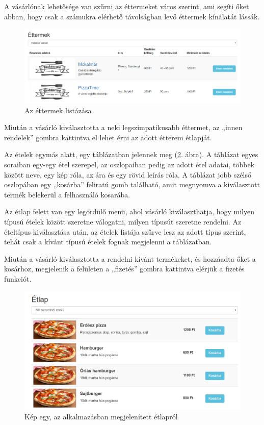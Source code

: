 A vásárlónak lehetősége van szűrni az éttermeket város szerint, ami segíti őket abban, hogy csak a számukra elérhető távolságban levő éttermek kínálatát lássák.

\begin{figure}
\centering
\includegraphics[scale=0.48]{kepek/restaurants.png}
\caption{Az éttermek listázása}
\label{fig:restaurants}
\end{figure}


Miután a vásárló kiválasztotta a neki legszimpatikusabb éttermet, az „innen rendelek” gombra kattintva el lehet érni az adott étterem étlapját.

Az ételek egymás alatt, egy táblázatban jelennek meg (\ref{fig:menu}. ábra). A táblázat egyes soraiban egy-egy étel szerepel, az oszlopaiban pedig az adott étel adatai, többek között neve, egy kép róla, az ára és egy rövid leírás róla. A táblázat jobb szélső oszlopában egy „kosárba” feliratú gomb található, amit megnyomva a kiválasztott termék belekerül a felhasználó kosarába.

Az étlap felett van egy legördülő menü, ahol vásárló kiválaszthatja, hogy milyen típusú ételek között szeretne válogatni, milyen típusút szeretne rendelni. Az ételtípus kiválasztása után, az ételek listája szűrve lesz az adott típus szerint, tehát csak a kívánt típusú ételek fognak megjelenni a táblázatban.

Miután a vásárló kiválasztotta a rendelni kívánt termékeket, és hozzáadta őket a kosárhoz, megjelenik a felületen a „fizetés” gombra kattintva elérjük a fizetés funkciót.

\begin{figure}
\centering
\includegraphics[scale=0.65]{kepek/menu.png}
\caption{Kép egy, az alkalmazásban megjelenített étlapról}
\label{fig:menu}
\end{figure}


